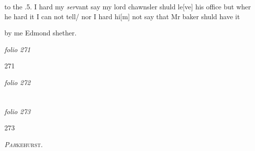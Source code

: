 \documentclass[12pt, a4paper]{book}
\begin{document}
		\ifthenelse{\isodd{\thepage}}
		{\reversemarginpar}
		{\normalmarginpar}
		to the .5. I hard my \textit{ser}vant say my lord chawnsler shuld le[ve]
his office but wher he hard it I can not tell/ nor I hard hi[m]
not say that Mr baker shuld have it 


		\ifthenelse{\isodd{\thepage}}
		{\reversemarginpar}
		{\normalmarginpar}
		by me Edmond shether.

\dotfill
						\newpage
{}

\textit{folio 271}


         	\begin{flushright}{\color{Mahogany}271}\end{flushright}


\dotfill
						\newpage
{}

\textit{folio 272}


         \vspace*{4cm}
         
\dotfill
						  \section*{}  \subsection*{}

\textit{folio 273}



            		\begin{flushright}{\color{Mahogany}273}\end{flushright}


				\marginpar[\vspace{0.5cm}{\textcolor{Gray}{E.}}]{}
			
	
				\begin{center}  {\scshape \textit{Par}kehurst. }  \end{center}
			
\end{document}
